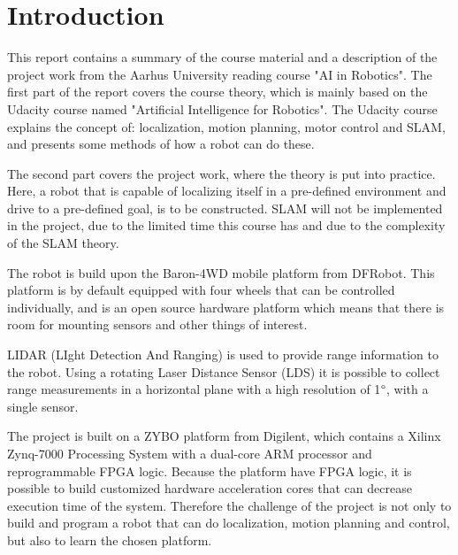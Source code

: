 \documentclass[Main]{subfiles}
\begin{document}
\part*{Introduction} %
\label{cha:introduction}

	This report contains a summary of the course material and a description of the project work from the Aarhus University reading course "AI in Robotics".
	The first part of the report covers the course theory, which is mainly based on the Udacity course named "Artificial Intelligence for Robotics".
	The Udacity course explains the concept of: localization, motion planning, motor control and SLAM, and presents some methods of how a robot can do these.
	
	The second part covers the project work, where the theory is put into practice.
	Here, a robot that is capable of localizing itself in a pre-defined environment and drive to a pre-defined goal, is to be constructed.
	SLAM will not be implemented in the project, due to the limited time this course has and due to the complexity of the SLAM theory.

	The robot is build upon the Baron-4WD mobile platform from DFRobot.
	This platform is by default equipped with four wheels that can be controlled individually, and is an open source hardware platform which means that there is room for mounting sensors and other things of interest.

	LIDAR (LIght Detection And Ranging) is used to provide range information to the robot.
	Using a rotating Laser Distance Sensor (LDS) it is possible to collect range measurements in a horizontal plane with a high resolution of 1$\degree$, with a single sensor.

	The project is built on a ZYBO platform from Digilent, which contains a Xilinx Zynq-7000 Processing System with a dual-core ARM processor and reprogrammable FPGA logic.
	Because the platform have FPGA logic, it is possible to build customized hardware acceleration cores that can decrease execution time of the system.
	Therefore the challenge of the project is not only to build and program a robot that can do localization, motion planning and control, but also to learn the chosen platform.

\end{document}
